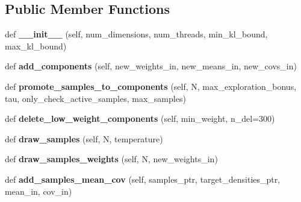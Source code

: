 \subsection*{Public Member Functions}
\begin{DoxyCompactItemize}
\item 
def {\bfseries \+\_\+\+\_\+init\+\_\+\+\_\+} (self, num\+\_\+dimensions, num\+\_\+threads, min\+\_\+kl\+\_\+bound, max\+\_\+kl\+\_\+bound)\hypertarget{classVIPS__PythonWrapper_1_1VIPS__PythonWrapper_ab6f9fbbadfba841cd317a0df11c2519f}{}\label{classVIPS__PythonWrapper_1_1VIPS__PythonWrapper_ab6f9fbbadfba841cd317a0df11c2519f}

\item 
def {\bfseries add\+\_\+components} (self, new\+\_\+weights\+\_\+in, new\+\_\+means\+\_\+in, new\+\_\+covs\+\_\+in)\hypertarget{classVIPS__PythonWrapper_1_1VIPS__PythonWrapper_a2e83abd123df46605bf9f509482ba6aa}{}\label{classVIPS__PythonWrapper_1_1VIPS__PythonWrapper_a2e83abd123df46605bf9f509482ba6aa}

\item 
def {\bfseries promote\+\_\+samples\+\_\+to\+\_\+components} (self, N, max\+\_\+exploration\+\_\+bonus, tau, only\+\_\+check\+\_\+active\+\_\+samples, max\+\_\+samples)\hypertarget{classVIPS__PythonWrapper_1_1VIPS__PythonWrapper_adf3bfe2bd7c08eb16161b980185c48b4}{}\label{classVIPS__PythonWrapper_1_1VIPS__PythonWrapper_adf3bfe2bd7c08eb16161b980185c48b4}

\item 
def {\bfseries delete\+\_\+low\+\_\+weight\+\_\+components} (self, min\+\_\+weight, n\+\_\+del=300)\hypertarget{classVIPS__PythonWrapper_1_1VIPS__PythonWrapper_a1f27ed4c1eb33b135c885a9134068a0a}{}\label{classVIPS__PythonWrapper_1_1VIPS__PythonWrapper_a1f27ed4c1eb33b135c885a9134068a0a}

\item 
def {\bfseries draw\+\_\+samples} (self, N, temperature)\hypertarget{classVIPS__PythonWrapper_1_1VIPS__PythonWrapper_accf6844547cc58211f290b9179137751}{}\label{classVIPS__PythonWrapper_1_1VIPS__PythonWrapper_accf6844547cc58211f290b9179137751}

\item 
def {\bfseries draw\+\_\+samples\+\_\+weights} (self, N, new\+\_\+weights\+\_\+in)\hypertarget{classVIPS__PythonWrapper_1_1VIPS__PythonWrapper_ab50ef56f6c26d4c9affffdcc098d7bb2}{}\label{classVIPS__PythonWrapper_1_1VIPS__PythonWrapper_ab50ef56f6c26d4c9affffdcc098d7bb2}

\item 
def {\bfseries add\+\_\+samples\+\_\+mean\+\_\+cov} (self, samples\+\_\+ptr, target\+\_\+densities\+\_\+ptr, mean\+\_\+in, cov\+\_\+in)\hypertarget{classVIPS__PythonWrapper_1_1VIPS__PythonWrapper_a7bd41147bb2f65758e925e1a5bf603c1}{}\label{classVIPS__PythonWrapper_1_1VIPS__PythonWrapper_a7bd41147bb2f65758e925e1a5bf603c1}


\end{DoxyCompactItemize}
